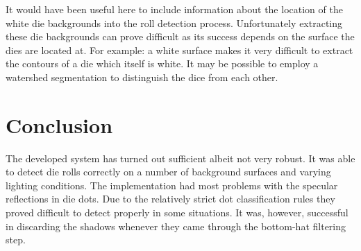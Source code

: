 It would have been useful here to include information about the location of the white die backgrounds into the roll detection process. Unfortunately extracting these die backgrounds can prove difficult as its success depends on the surface the dies are located at. For example: a white surface makes it very difficult to extract the contours of a die which itself is white. It may be possible to employ a watershed segmentation to distinguish the dice from each other. 

\section{Conclusion}
The developed system has turned out sufficient albeit not very robust. It was able to detect die rolls correctly on a number of background surfaces and varying lighting conditions. The implementation had most problems with the specular reflections in die dots. Due to the relatively strict dot classification rules they proved difficult to detect properly in some situations. It was, however, successful in discarding the shadows whenever they came through the bottom-hat filtering step. 